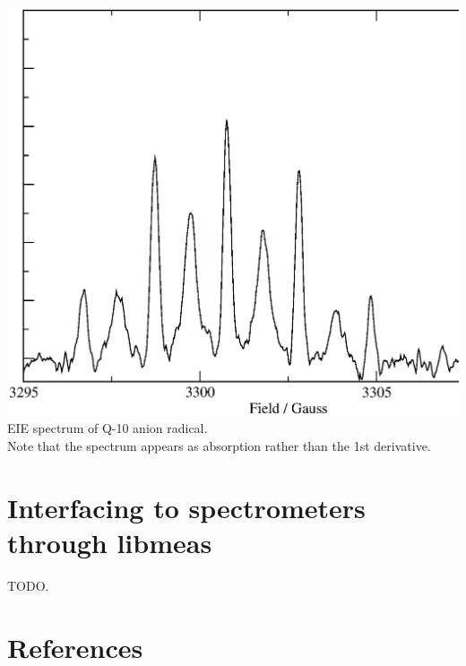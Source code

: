 \documentclass[byrevtex,amssymb,aps,pra,floatfix,letterpaper]{revtex4}
\begin{document}
\begin{center}
\includegraphics*[scale=0.4]{fig23}\\
EIE spectrum of Q-10 anion radical.\\
Note that the spectrum appears as absorption rather than the 1st derivative.
\end{center}

\section{Interfacing to spectrometers through libmeas}

TODO.

\newpage

\section{References}


\end{document}
